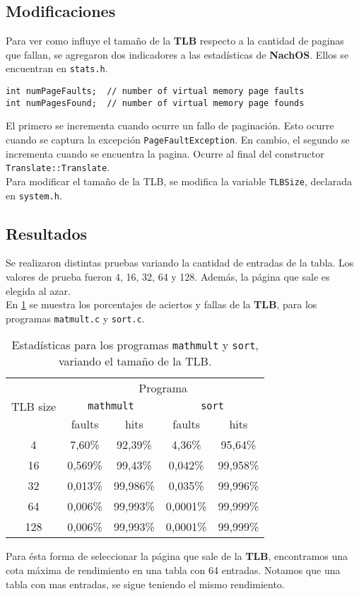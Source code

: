 \subsection*{Modificaciones}
Para ver como influye el tamaño de la \textbf{TLB} respecto a la cantidad de paginas que fallan, se agregaron dos indicadores a las estadísticas de \textbf{NachOS}. Ellos se encuentran en \texttt{stats.h}.
\begin{lstlisting}[style=C]
int numPageFaults;  // number of virtual memory page faults
int numPagesFound;  // number of virtual memory page founds
\end{lstlisting}
El primero se incrementa cuando ocurre un fallo de paginación. Esto ocurre cuando se captura la excepción \texttt{PageFaultException}. En cambio, el segundo se incrementa cuando se encuentra la pagina. Ocurre al final del constructor \texttt{Translate::Translate}.\\
Para modificar el tamaño de la TLB, se modifica la variable \texttt{TLBSize}, declarada en \texttt{system.h}.
\subsection*{Resultados}
Se realizaron distintas pruebas variando la cantidad de entradas de la tabla. Los valores de prueba fueron 4, 16, 32, 64 y 128. Además, la página que sale es elegida al azar.\\
En \ref{tab:practica04:statics} se muestra los porcentajes de aciertos y fallas de la \textbf{TLB}, para los programas \texttt{matmult.c} y \texttt{sort.c}.\\ 
\begin{table}
	\center
	\begin{tabular}{|c|c|c|c|c|}
	    \hline
		\multirow{3}{*}{TLB size}   &    \multicolumn{4}{c|}{Programa}           \\
		\cline{2-5}
            &            \multicolumn{2}{c|}{\texttt{mathmult}}    &    \multicolumn{2}{c|}{\texttt{sort}} \\
        \cline{2-5}
            &    faults    &    hits       &    faults    &    hits    \\
		\hline
		4   &    7,60\%    &    92,39\%    &    4,36\%    &    95,64\% \\
       16   &    0,569\%   &    99,43\%    &    0,042\%   &    99,958\%   \\
       32   &    0,013\%   &    99,986\%   &    0,035\%   &    99,996\%    \\               
       64   &    0,006\%   &    99,993\%   &    0,0001\%  &    99,999\%    \\               
      128   &    0,006\%   &    99,993\%   &    0,0001\%  &    99,999\%    \\    \hline             
	\end{tabular}
    \caption{Estadísticas para los programas \texttt{mathmult} y \texttt{sort}, variando el tamaño de la TLB.}
	\label{tab:practica04:statics}
\end{table}
Para ésta forma de seleccionar la página  que sale de la \textbf{TLB}, encontramos una cota máxima de rendimiento en una tabla con 64 entradas. Notamos que una tabla con mas entradas, se sigue teniendo el mismo rendimiento.
\newpage
